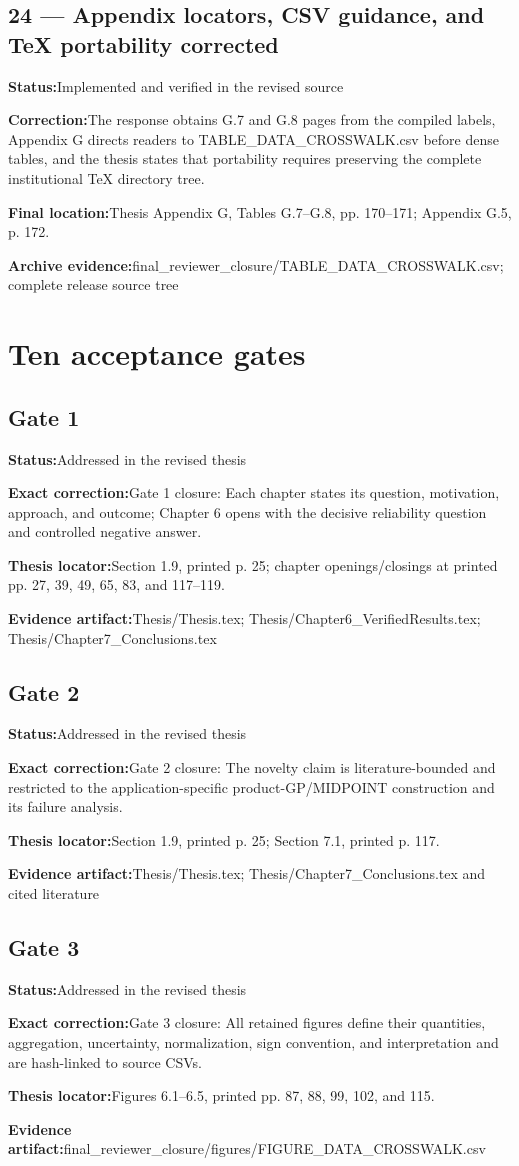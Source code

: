 \documentclass[11pt]{article}
\newcommand{\field}[2]{\textbf{#1}\quad #2\par}
\begin{document}
\subsection*{24 --- Appendix locators, CSV guidance, and TeX portability corrected}
\field{Status:}{Implemented and verified in the revised source}
\field{Correction:}{The response obtains G.7 and G.8 pages from the compiled labels, Appendix G directs readers to TABLE\_DATA\_CROSSWALK.csv before dense tables, and the thesis states that portability requires preserving the complete institutional TeX directory tree.}
\field{Final location:}{Thesis Appendix G, Tables G.7--G.8, pp. 170--171; Appendix G.5, p. 172.}
\field{Archive evidence:}{final\_reviewer\_closure/TABLE\_DATA\_CROSSWALK.csv; complete release source tree}
\section*{Ten acceptance gates}
\subsection*{Gate 1}
\field{Status:}{Addressed in the revised thesis}
\field{Exact correction:}{Gate 1 closure: Each chapter states its question, motivation, approach, and outcome; Chapter 6 opens with the decisive reliability question and controlled negative answer.}
\field{Thesis locator:}{Section 1.9, printed p. 25; chapter openings/closings at printed pp. 27, 39, 49, 65, 83, and 117--119.}
\field{Evidence artifact:}{Thesis/Thesis.tex; Thesis/Chapter6\_VerifiedResults.tex; Thesis/Chapter7\_Conclusions.tex}
\subsection*{Gate 2}
\field{Status:}{Addressed in the revised thesis}
\field{Exact correction:}{Gate 2 closure: The novelty claim is literature-bounded and restricted to the application-specific product-GP/MIDPOINT construction and its failure analysis.}
\field{Thesis locator:}{Section 1.9, printed p. 25; Section 7.1, printed p. 117.}
\field{Evidence artifact:}{Thesis/Thesis.tex; Thesis/Chapter7\_Conclusions.tex and cited literature}
\subsection*{Gate 3}
\field{Status:}{Addressed in the revised thesis}
\field{Exact correction:}{Gate 3 closure: All retained figures define their quantities, aggregation, uncertainty, normalization, sign convention, and interpretation and are hash-linked to source CSVs.}
\field{Thesis locator:}{Figures 6.1--6.5, printed pp. 87, 88, 99, 102, and 115.}
\field{Evidence artifact:}{final\_reviewer\_closure/figures/FIGURE\_DATA\_CROSSWALK.csv}
\end{document}
